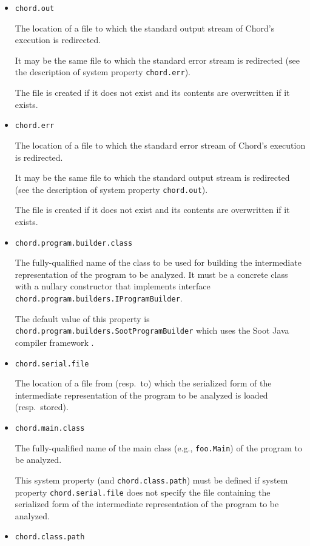 \documentclass{article}
\providecommand\Chord{{Chord}}
\begin{document}
\begin{itemize}
\item
{\tt chord.out}

The location of a file to which the standard output stream
of \Chord's execution is redirected.

It may be the same file to which the standard error stream is redirected (see
the description of system property {\tt chord.err}).

The file is created if it does not exist and its contents are overwritten if it exists.

\item
{\tt chord.err}

The location of a file to which the standard error stream
of \Chord's execution is redirected.

It may be the same file to which the standard output stream is redirected (see
the description of system property {\tt chord.out}).

The file is created if it does not exist and its contents are overwritten if it exists.

\item
{\tt chord.program.builder.class}

The fully-qualified name of the class to be used for building the
intermediate representation of the program to be analyzed.
It must be a concrete class with a nullary constructor that
implements interface {\tt chord.program.builders.IProgramBuilder}.

The default value of this property is {\tt chord.program.builders.SootProgramBuilder}
which uses the Soot Java compiler framework \cite{Soot}.

\item
{\tt chord.serial.file}

The location of a file from (resp.\ to) which
the serialized form of the intermediate representation of the
program to be analyzed is loaded (resp.\ stored).

\item
{\tt chord.main.class}

The fully-qualified name of the main class (e.g., {\tt foo.Main}) of the
program to be analyzed.

This system property (and {\tt chord.class.path})
must be defined if system property {\tt chord.serial.file}
does not specify the file containing the serialized form of the intermediate representation
of the program to be analyzed.

\item
{\tt chord.class.path}


\end{itemize}
\end{document}
